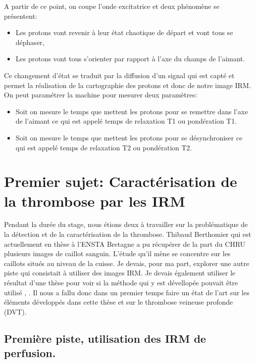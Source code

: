 A partir de ce point, on coupe l'onde excitatrice et deux phénomène se présentent:

\begin{itemize}
\item Les protons vont revenir à leur état chaotique de départ et vont tous se déphaser,
\item Les protons vont tous s'orienter par rapport à l'axe du champs de l'aimant.
\end{itemize}

Ce changement d'état se traduit par la diffusion d'un signal qui est capté et permet la réalisation de la cartographie des protons et donc de notre image IRM. On peut paramétrer la machine pour mesurer deux paramètres:

\begin{itemize}
\item Soit on mesure le temps que mettent les protons pour se remettre dans l'axe de l'aimant ce qui est appelé temps de relaxation T1 ou pondération T1.
\item Soit on mesure le temps que mettent les protons pour se désynchroniser ce qui est appelé temps de relaxation T2 ou pondération T2.
\end{itemize}


\chapter{Premier sujet: Caractérisation de la thrombose par les IRM}


Pendant la durée du stage, nous étions deux à travailler sur la problématique de la détection et de la caractérisation de la thrombose. Thibaud Berthomier qui est actuellement en thèse à l'ENSTA Bretagne a pu récupérer de la part du CHRU plusieurs images de caillot sanguin. L'étude qu'il mène se concentre sur les caillots situés au niveau de la cuisse. Je devais, pour ma part, explorer une autre piste qui consistait à utiliser des images IRM. Je devais également utiliser le résultat d'une thèse pour voir si la méthode qui y est dévellopée pouvait être utilisé \cite{tartare2014contribution}, \cite{tartare2014spectral}. Il nous a fallu donc dans un premier temps faire un état de l'art sur les éléments développés dans cette thèse et sur le thrombose veineuse profonde (DVT).


\section{Première piste, utilisation des IRM de perfusion.}

